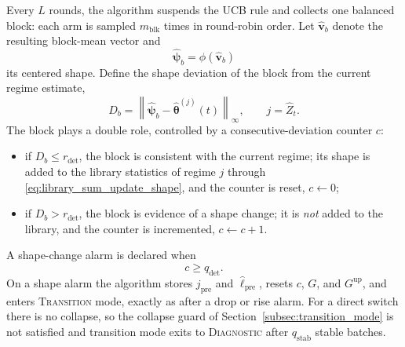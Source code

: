 \documentclass[11pt]{article}
\newcommand{\norm}[1]{\left\lVert #1 \right\rVert}
\begin{document}
Every $L$ rounds, the algorithm suspends the UCB rule and collects one balanced block: each arm is sampled $m_{\mathrm{blk}}$ times in round-robin order. Let $\widehat{\bm v}_{b}$ denote the resulting block-mean vector and
\begin{equation}
\label{eq:probe_shape}
\widehat{\bm\psi}_{b}=\phi(\widehat{\bm v}_{b})
\end{equation}
its centered shape. Define the shape deviation of the block from the current regime estimate,
\begin{equation}
\label{eq:probe_deviation}
D_{b}
=
\norm{\widehat{\bm\psi}_{b}-\widehat{\bm\theta}^{(j)}(t)}_{\infty},
\qquad j=\widehat Z_t .
\end{equation}
The block plays a double role, controlled by a consecutive-deviation counter $c$:
\begin{itemize}
\item if $D_{b}\leq r_{\mathrm{det}}$, the block is consistent with the current regime; its shape is added to the library statistics of regime $j$ through \eqref{eq:library_sum_update_shape}, and the counter is reset, $c\gets 0$;
\item if $D_{b}> r_{\mathrm{det}}$, the block is evidence of a shape change; it is \emph{not} added to the library, and the counter is incremented, $c\gets c+1$.
\end{itemize}
A shape-change alarm is declared when
\begin{equation}
\label{eq:shape_alarm}
c\geq q_{\mathrm{det}}.
\end{equation}
On a shape alarm the algorithm stores $j_{\mathrm{pre}}$ and $\widehat\ell_{\mathrm{pre}}$, resets $c$, $G$, and $G^{\mathrm{up}}$, and enters \textsc{Transition} mode, exactly as after a drop or rise alarm. For a direct switch there is no collapse, so the collapse guard of Section~\ref{subsec:transition_mode} is not satisfied and transition mode exits to \textsc{Diagnostic} after $q_{\mathrm{stab}}$ stable batches.
\end{document}
